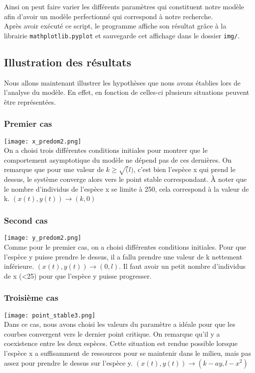 \documentclass{article}
\begin{document}
\vspace{0.5cm}
Ainsi on peut faire varier les différents paramètres qui constituent notre modèle afin d'avoir un modèle perfectionné qui correspond à notre recherche.\\
Après avoir exécuté ce script, le programme affiche son résultat grâce à la librairie \verb|mathplotlib.pyplot| et sauvegarde cet affichage dans le dossier \verb|img/|.

\newpage
\subsection{Illustration des résultats}
Nous allons maintenant illustrer les hypothèses que nous avons établies lors de l'analyse du modèle. En effet, en fonction de celles-ci plusieurs situations  peuvent être représentées.

\subsubsection{Premier cas}
\texttt{[image: x\_predom2.png]}\\
On a choisi trois différentes conditions initiales pour montrer que le comportement asymptotique du modèle ne dépend pas de ces dernières. On remarque que pour une valeur de $k\geqslant \sqrt(l)$, c'est bien l'espèce x qui prend le dessus, le système converge alors vers le point stable correspondant. À noter que le nombre d'individus de l'espèce x se limite à 250, cela correspond à la valeur de k. $(x(t),y(t)) \longrightarrow (k,0) $

\subsubsection{Second cas}
\texttt{[image: y\_predom2.png]}\\
Comme pour le premier cas, on a choisi différentes conditions initiales. Pour que l'espèce y puisse prendre le dessus, il a fallu prendre une valeur de k nettement inférieure. $(x(t),y(t)) \longrightarrow (0,l) $. Il faut avoir un petit nombre d'individus de x (<25) pour que l'espèce y puisse progresser.

\subsubsection{Troisième cas}
\texttt{[image: point\_stable3.png]}\\
Dans ce cas, nous avons choisi les valeurs du paramètre a idéale pour que les courbes convergent vers le dernier point critique. On remarque qu'il y a coexistence entre les deux espèces. Cette situation est rendue possible lorsque l'espèce x a suffisamment de ressources pour se maintenir dans le milieu, mais pas assez pour prendre le dessus sur l'espèce y. $(x(t),y(t)) \longrightarrow (k-ay,l-x^2)$
\end{document}
